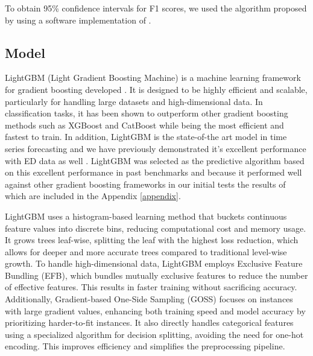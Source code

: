 To obtain 95\% confidence intervals for F1 scores, we used the algorithm proposed by \citet{Takahashi2022} using a software implementation of \citet{Gildenblat2023}.

\subsection{Model}

LightGBM (Light Gradient Boosting Machine) is a machine learning framework for gradient boosting developed \citet{Ke2017}. It is designed to be highly efficient and scalable, particularly for handling large datasets and high-dimensional data. In classification tasks, it has been shown to outperform other gradient boosting methods such as XGBoost and CatBoost \cite{Florek2023} while being the most efficient and fastest to train. In addition, LightGBM is the state-of-the art model in time series forecasting \cite{Makridakis2022} and we have previously demonstrated it's excellent performance with ED data as well \cite{Tuominen2023}. LightGBM was selected as the predictive algorithm based on this excellent performance in past benchmarks and because it performed well against other gradient boosting frameworks in our initial tests the results of which are included in the Appendix \ref{appendix}.

LightGBM uses a histogram-based learning method that buckets continuous feature values into discrete bins, reducing computational cost and memory usage. It grows trees leaf-wise, splitting the leaf with the highest loss reduction, which allows for deeper and more accurate trees compared to traditional level-wise growth. To handle high-dimensional data, LightGBM employs Exclusive Feature Bundling (EFB), which bundles mutually exclusive features to reduce the number of effective features. This results in faster training without sacrificing accuracy. Additionally, Gradient-based One-Side Sampling (GOSS) focuses on instances with large gradient values, enhancing both training speed and model accuracy by prioritizing harder-to-fit instances. It also directly handles categorical features using a specialized algorithm for decision splitting, avoiding the need for one-hot encoding. This improves efficiency and simplifies the preprocessing pipeline.

